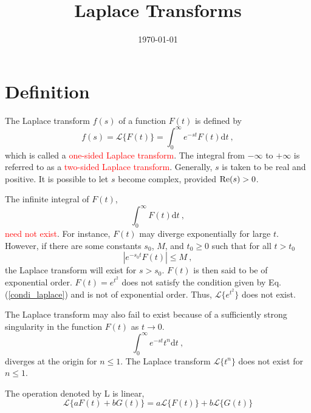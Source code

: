 \documentclass[12pt,a4paper]{article}
\title{Laplace Transforms}
\author{}
\date{\today}
\newcommand{\dif}{\mathrm{d}}
\begin{document}
\maketitle
\section{Definition}
\cite{arfken} The Laplace transform $f(s)$ of a function $F(t)$ is defined by
\begin{equation}
f(s) = \mathcal L \{F(t) \} = \int_0^\infty e^{-st} F(t) \dif t ~,
\end{equation}
which is called a \textcolor{red}{one-sided Laplace transform}. The integral from $-\infty$ to $+\infty$ is referred to as a \textcolor{red}{two-sided Laplace transform}. Generally, $s$ is taken to be real and positive. It is possible to let $s$ become complex, provided ${\rm Re}(s) > 0$.

The infinite integral of $F(t)$, 
\begin{equation*}
\int_0^\infty F(t) \dif t ~,
\end{equation*}
\textcolor{red}{need not exist}. For instance, $F(t)$ may diverge exponentially for large $t$. However, if there are some constants $s_0$, $M$, and $t_0 \geqslant 0$ such that for all $t > t_0$
\begin{equation}
|e^{-s_0 t} F(t)| \leqslant M ~,
\label{condi_laplace}
\end{equation}
the Laplace transform will exist for $s > s_0$. $F(t)$ is then said to be of exponential order. $F(t) = e^{t^2}$ does not satisfy the condition given by Eq. (\ref{condi_laplace}) and is not of exponential order. Thus, $\mathcal L \{ e^{t^2}\}$ does not exist.

The Laplace transform may also fail to exist because of a sufficiently strong singularity in the function $F(t)$ as $t \rightarrow 0$.
\begin{equation*}
\int_0^\infty e^{-st} t^n \dif t ~,
\end{equation*}
diverges at the origin for $n \leqslant 1$. The Laplace transform $\mathcal L \{ t^n\}$ does not exist for $n \leqslant 1$.

The operation denoted by L is linear,
\begin{equation}
\mathcal L \{aF(t) +bG(t) \} = a \mathcal L \{F(t) \} + b \mathcal L \{G(t) \} 
\end{equation}
\end{document}
